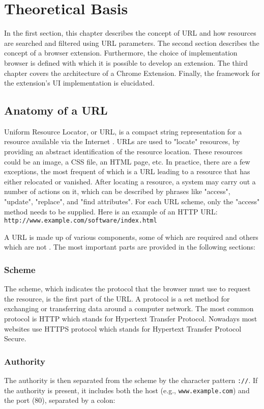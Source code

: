 \newpage
\chapter{Theoretical Basis}
In the first section, this chapter describes the concept of URL and how resources are searched and filtered using URL parameters. The second section describes the concept of a browser extension. Furthermore, the choice of implementation browser is defined with which it is possible to develop an extension. The third chapter covers the architecture of a Chrome Extension. Finally, the framework for the extension's UI implementation is elucidated.

\section{Anatomy of a URL}
\label{url_anatomy}
Uniform Resource Locator, or URL, is a compact string representation for a resource available via the Internet \autocite{berners1994uniform}. URLs are used to "locate" resources, by providing an abstract identification of the resource location. These resources could be an image, a CSS file, an HTML page, etc. In practice, there are a few exceptions, the most frequent of which is a URL leading to a resource that has either relocated or vanished. After locating a resource, a system may carry out a number of actions on it, which can be described by phrases like "access", "update", "replace", and "find attributes". For each URL scheme, only the "access" method needs to be supplied. Here is an example of an HTTP URL: \texttt{http://www.example.com/software/index.html}

A URL is made up of various components, some of which are required and others which are not \autocite{mozilla2022url}. The most important parts are provided in the following sections:

\subsection{Scheme}
The scheme, which indicates the protocol that the browser must use to request the resource, is the first part of the URL. A protocol is a set method for exchanging or transferring data around a computer network. The most common protocol is HTTP which stands for Hypertext Transfer Protocol. Nowadays most websites use HTTPS protocol which stands for Hypertext Transfer Protocol Secure.

\subsection{Authority}
The authority is then separated from the scheme by the character pattern \texttt{://}. If the authority is present, it includes both the host (e.g., \texttt{www.example.com}) and the port (80), separated by a colon:

